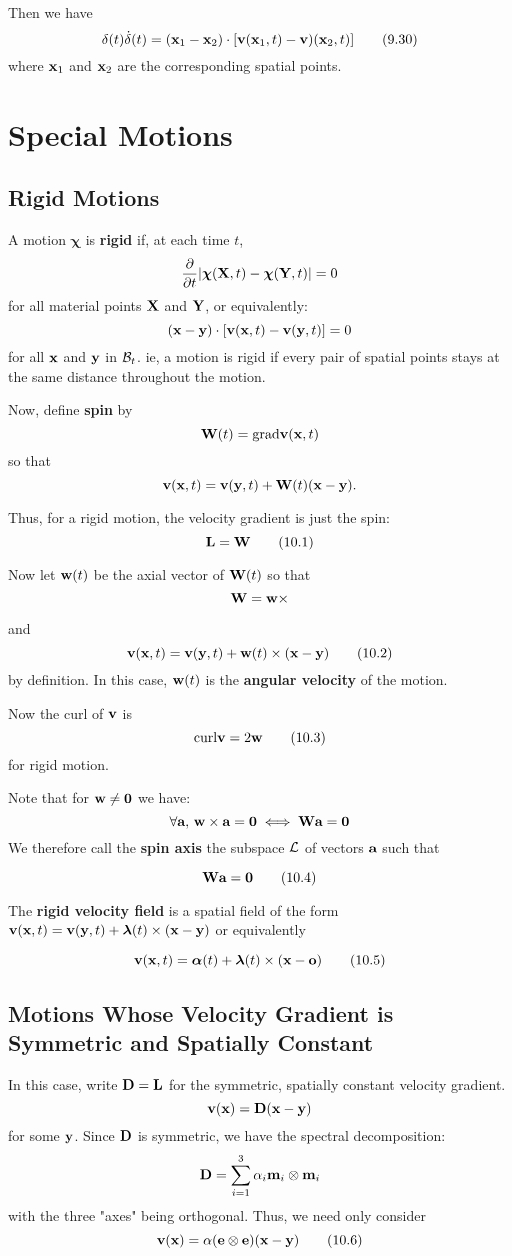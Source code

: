 \documentclass{article}
\newcommand{\Chi}{\boldsymbol{\chi}}
\begin{document}
Then we have
\[
	\delta(t)\dot{\delta}(t) = (\textbf{x}_1-\textbf{x}_2)\cdot[\textbf{v}(\textbf{x}_1,t) - \textbf{v})(\textbf{x}_2,t)]\tag{9.30}
\]
where $\textbf{x}_1$ and $\textbf{x}_2$ are the corresponding spatial points.

\section{Special Motions}
\subsection{Rigid Motions}
A motion $\Chi$ is \textbf{rigid} if, at each time $t$,
$$\pd{}{t}|\Chi(\X,t) - \Chi(\Y,t)| = 0$$
for all material points $\textbf{X}$ and $\textbf{Y}$, or equivalently:
$$(\textbf{x} - \textbf{y})\cdot[\textbf{v}(\textbf{x},t) - \textbf{v}(\textbf{y},t)] = 0$$
for all $\textbf{x}$ and $\textbf{y}$ in $\mathcal{B}_t$.
ie, a motion is rigid if every pair of spatial points stays at the same distance throughout the motion.

Now, define \textbf{spin} by
\[
	\textbf{W}(t) = \text{grad}\textbf{v}(\textbf{x},t)
\]
so that
\[
	\textbf{v}(\textbf{x},t) = \textbf{v}(\textbf{y},t) + \textbf{W}(t)(\textbf{x}-\textbf{y}).
\]

Thus, for a rigid motion, the velocity gradient is just the spin:
\[
	\textbf{L} = \textbf{W}\tag{10.1}
\]

Now let $\textbf{w}(t)$ be the axial vector of $\textbf{W}(t)$ so that
\[
	\textbf{W} = \textbf{w}\times
\]

and
\[
	\textbf{v}(\textbf{x},t) = \textbf{v}(\textbf{y},t) + \textbf{w}(t)\times(\textbf{x}-\textbf{y})\tag{10.2}
\]
by definition.
In this case, $\textbf{w}(t)$ is the \textbf{angular velocity} of the motion.

Now the curl of $\textbf{v}$ is 
\[
	\text{curl}\textbf{v} = 2\textbf{w}\tag{10.3}
\]
for rigid motion.

Note that for $\textbf{w} \ne \textbf{0}$ we have:
$$\forall\textbf{a}, \, \textbf{w}\times\textbf{a}=\textbf{0} \iff \textbf{W}\textbf{a}=\textbf{0}$$
We therefore call the \textbf{spin axis} the subspace $\mathcal{L}$ of vectors $\textbf{a}$ such that

\[
	\textbf{W}\textbf{a} = \textbf{0}\tag{10.4}
\]

The \textbf{rigid velocity field} is a spatial field of the form $\textbf{v}(\textbf{x},t) = \textbf{v}(\textbf{y},t) + \boldsymbol{\lambda}(t)\times(\textbf{x} - \textbf{y})$ or equivalently

\[
	\textbf{v}(\textbf{x},t) = \boldsymbol{\alpha}(t) + \boldsymbol{\lambda}(t)\times(\textbf{x}-\textbf{o})\tag{10.5}
\] 
\subsection{Motions Whose Velocity Gradient is Symmetric and Spatially Constant}
In this case, write $\textbf{D} = \textbf{L}$ for the symmetric, spatially constant velocity gradient.
\[
	\textbf{v}(\textbf{x}) = \textbf{D}(\textbf{x}-\textbf{y})
\]
for some $\textbf{y}$. Since $\textbf{D}$ is symmetric, we have the spectral decomposition:
\[
	\textbf{D} = \sum_{i=1}^{3}\alpha_i\textbf{m}_i\otimes\textbf{m}_i
\]
with the three "axes" being orthogonal. Thus, we need only consider
\[
	\textbf{v}(\textbf{x}) = \alpha(\textbf{e}\otimes\textbf{e})(\textbf{x}-\textbf{y})\tag{10.6}
\]
\end{document}
